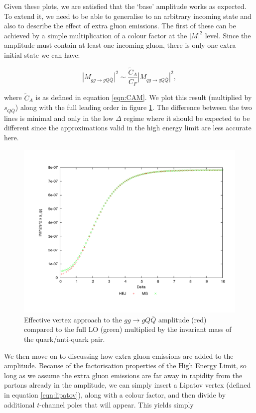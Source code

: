 Given these plots, we are satisfied that the `base' amplitude works as expected. To extend it, we need to be able to generalise to an arbitrary incoming state and also to describe the effect of extra gluon emissions. The first of these can be achieved by a simple multiplication of a colour factor at the $|M|^2$ level. Since the amplitude must contain at least one incoming gluon, there is only one extra initial state we can have:

\begin{equation}
|M_{gg \to gQ\bar{Q}}|^2 \sim \frac{\tilde{C}_A}{C_F} |M_{qg \to qQ\bar{Q}}|^2,
\end{equation}

where $\tilde{C}_A$ is as defined in equation \ref{eqn:CAM}. We plot this result (multiplied by $s_{Q\bar{Q}}$) along with the full leading order in figure \ref{fig:gg_qqq}. The difference between the two lines is minimal and only in the low $\Delta$ regime where it should be expected to be different since the approximations valid in the high energy limit are less accurate here. 

\begin{figure}[t]
\centering
\includegraphics[scale=0.45]{Images/gg_gQQx_sqqx_simplecf.pdf}
\caption{Effective vertex approach to the $gg \to gQ\bar{Q}$ amplitude (red) compared to the full LO (green) multiplied by the invariant mass of the quark/anti-quark pair.}
\label{fig:gg_qqq}
\end{figure}

We then move on to discussing how extra gluon emissions are added to the amplitude. Because of the factorisation properties of the High Energy Limit, so long as we assume the extra gluon emissions are far away in rapidity from the partons already in the amplitude, we can simply insert a Lipatov vertex (defined in equation \ref{eqn:lipatov}), along with a colour factor, and then divide by additional $t$-channel poles that will appear. This yields simply

